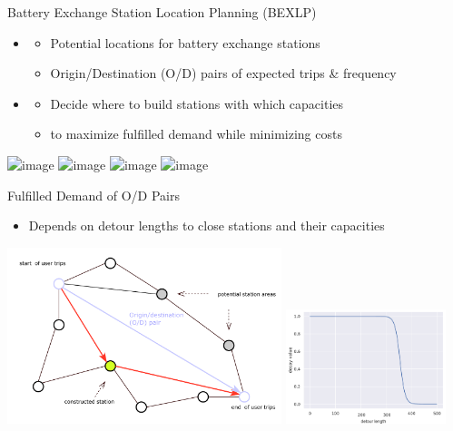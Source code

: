 \documentclass[aspectratio=1610]{beamer}
\newcommand{\important}[1]{{\color{green!60!black}#1}}
\begin{document}
\begin{frame}{Battery Exchange Station Location Planning (BEXLP)}
\begin{itemize}
\item {} 
	\begin{itemize}
		\item Potential locations for battery exchange stations
		\item Origin/Destination (O/D) pairs of expected trips \& frequency
	\end{itemize}
\item {}
	\begin{itemize}
		\item Decide where to build stations with which capacities
		\item to maximize fulfilled demand while minimizing costs
	\end{itemize}
\end{itemize}

\begin{center}
	\includegraphics<1>[width=0.5\textwidth]{graphics/bex1.jpg}
	\includegraphics<2>[width=0.5\textwidth]{graphics/bex2.jpg}
	\includegraphics<3>[width=0.5\textwidth]{graphics/bex3.jpg}
	\includegraphics<4>[width=0.5\textwidth]{graphics/bex4.jpg}
\end{center}
\end{frame}

\begin{frame}{Fulfilled Demand of O/D Pairs}
\begin{itemize}
	\item Depends on \important{detour lengths} to close stations and their \important{capacities}
\end{itemize}
\begin{center}
	\includegraphics[width=0.6\textwidth]{graphics/graph_third.pdf}
	\includegraphics[width=0.35\textwidth]{graphics/decay.pdf}
\end{center}
\end{frame}
\end{document}

